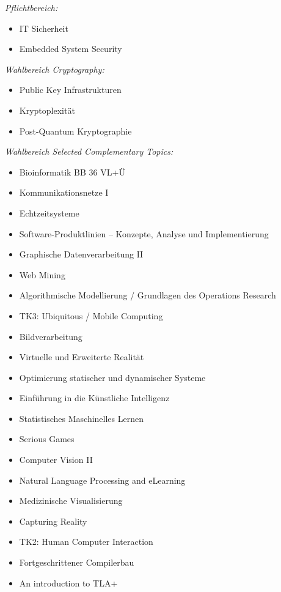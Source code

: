 {    \textit{Pflichtbereich:}
    \begin{itemize}[noitemsep]
        \item IT Sicherheit
        \item Embedded System Security
    \end{itemize}
    \textit{Wahlbereich Cryptography:}
    \begin{itemize}[noitemsep]
        \item Public Key Infrastrukturen
        \item Kryptoplexität
        \item Post-Quantum Kryptographie
    \end{itemize}
    \textit{Wahlbereich Selected Complementary Topics:}
    \begin{itemize}[noitemsep]
        \item Bioinformatik BB 36 VL+Ü
        \item Kommunikationsnetze I
        \item Echtzeitsysteme
        \item Software-Produktlinien – Konzepte, Analyse und Implementierung
        \item Graphische Datenverarbeitung II
        \item Web Mining
        \item Algorithmische Modellierung / Grundlagen des Operations Research
        \item TK3: Ubiquitous / Mobile Computing
        \item Bildverarbeitung
        \item Virtuelle und Erweiterte Realität
        \item Optimierung statischer und dynamischer Systeme
        \item Einführung in die Künstliche Intelligenz
        \item Statistisches Maschinelles Lernen
        \item Serious Games
        \item Computer Vision II
        \item Natural Language Processing and eLearning
        \item Medizinische Visualisierung
        \item Capturing Reality
        \item TK2: Human Computer Interaction
        \item Fortgeschrittener Compilerbau
        \item An introduction to TLA+

\end{itemize}}
